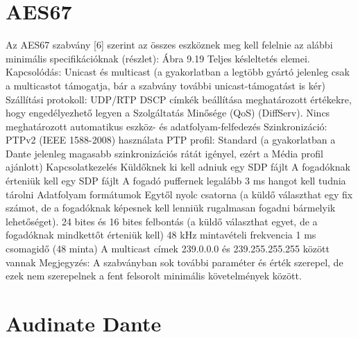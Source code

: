 \section{AES67}
Az AES67 szabvány [6] szerint az összes eszköznek meg kell felelnie az
alábbi minimális specifikációknak (részlet): Ábra 9.19 Teljes késleltetés elemei.
Kapcsolódás: Unicast és multicast (a gyakorlatban a legtöbb gyártó jelenleg
csak a multicastot támogatja, bár a szabvány további unicast-támogatást is kér)
Szállítási protokoll: UDP/RTP DSCP címkék beállítása meghatározott értékekre,
hogy engedélyezhető legyen a Szolgáltatás Minősége (QoS) (DiffServ). Nincs
meghatározott automatikus eszköz- és adatfolyam-felfedezés Szinkronizáció: PTPv2
(IEEE 1588-2008) használata PTP profil: Standard (a gyakorlatban a Dante
jelenleg magasabb szinkronizációs rátát igényel, ezért a Média profil ajánlott)
Kapcsolatkezelés Küldőknek ki kell adniuk egy SDP fájlt A fogadóknak érteniük
kell egy SDP fájlt A fogadó puffernek legalább 3 ms hangot kell tudnia tárolni
Adatfolyam formátumok Egytől nyolc csatorna (a küldő választhat egy fix számot,
de a fogadóknak képesnek kell lenniük rugalmasan fogadni bármelyik lehetőséget).
24 bites és 16 bites felbontás (a küldő választhat egyet, de a fogadóknak
mindkettőt érteniük kell) 48 kHz mintavételi frekvencia 1 ms csomagidő (48
minta) A multicast címek 239.0.0.0 és 239.255.255.255 között vannak Megjegyzés:
A szabványban sok további paraméter és érték szerepel, de ezek nem szerepelnek a
fent felsorolt minimális követelmények között.


\section{Audinate Dante}
